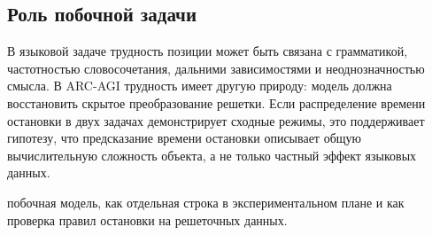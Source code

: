 \subsection{Роль побочной задачи}

В языковой задаче трудность позиции может быть связана с грамматикой, частотностью словосочетания,
дальними зависимостями и неоднозначностью смысла. В ARC-AGI трудность имеет другую природу: модель
должна восстановить скрытое преобразование решетки. Если распределение времени остановки в двух
задачах демонстрирует сходные режимы, это поддерживает гипотезу, что предсказание времени
остановки описывает общую вычислительную сложность объекта, а не только частный эффект языковых
данных.

побочная модель, как отдельная строка в экспериментальном плане и как проверка правил остановки на
решеточных данных.


